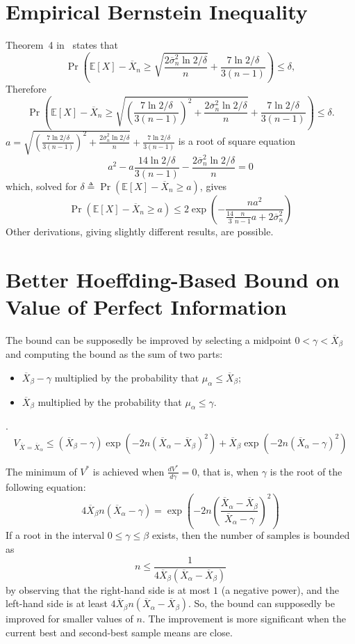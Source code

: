 \documentclass{article}
\newcommand {\IE} {\ensuremath {\mathbb{E}}}
\begin{document}
\clearpage

\appendix

\section{Empirical Bernstein Inequality}
\label{app:deriv-conc-empbernstein}

Theorem~4 in~\cite{MaurerPontil.benrstein} states that
\[\Pr\left(\IE[X]-\overline X_n \ge \sqrt { \frac {2\overline\sigma_n^2 \ln 2/\delta} n } + \frac {7 \ln 2/\delta} {3(n-1)}\right)\le \delta,\]
Therefore
\[\Pr\left(\IE[X]-\overline X_n \ge \sqrt { \left(\frac {7 \ln 2/\delta} {3(n-1)}\right)^2+\frac {2\overline\sigma_n^2 \ln 2/\delta} n } + \frac {7 \ln 2/\delta} {3(n-1)}\right)\le
\delta.\]
$a=\sqrt { \left(\frac {7 \ln 2/\delta} {3(n-1)}\right)^2+\frac {2\overline\sigma_n^2 \ln 2/\delta} n } + \frac {7 \ln 2/\delta} {3(n-1)}$ is a root of
square equation
\[a^2-a\frac {14 \ln 2/\delta} {3(n-1)} -\frac {2\overline\sigma_n^2 \ln 2/\delta} n=0\]
which, solved for $\delta\triangleq\Pr(\IE[X]-\overline X_n\ge a)$,
gives
\[\Pr(\IE[X]-\overline X_n\ge a)\le 2\exp \left( - \frac {na^2} {\frac {14} {3} \frac {n} {n-1}a+2\overline\sigma_n^2}\right)\]
Other derivations, giving slightly different results, are possible.

\section{Better Hoeffding-Based Bound on Value of Perfect Information}
\label{app:better-hoeffding-bound}

The bound can be supposedly be improved by selecting a midpoint
$0 < \gamma < \overline X_\beta$ and computing the bound as the sum of two parts:
\begin{itemize}
\item $\overline X_\beta-\gamma$ multiplied by the probability that
  $\mu_\alpha \le \overline X_\beta$;
\item $\overline X_\beta$ multiplied by the probability that $\mu_\alpha\le
  \gamma$.
\end{itemize}.
\[ V_{\overline X=\overline X_\alpha} \le (\overline X_\beta-\gamma)\exp\left(-2n(\overline X_\alpha-\overline X_\beta)^2\right)+\overline X_\beta\exp\left(-2n(\overline X_\alpha-\gamma)^2\right) \]

\vspace{\baselineskip}

The minimum of $V^*$ is achieved when $\frac {dV^*} {d\gamma}=0$, that
is, when $\gamma$ is the root of the following equation:
\[ 4\overline X_\beta n(\overline X_\alpha-\gamma)=\exp\left(-2n\left(\frac {\overline X_\alpha-\overline X_\beta}
    {\overline X_\alpha-\gamma}\right)^2\right) \]
If a root in the interval  $0\le\gamma\le\beta$ exists, then the
number of samples is bounded as
\[n\le\frac 1 {4\overline X_\beta(\overline X_\alpha-\overline X_\beta)}\]
by observing that the right-hand side 
is at most $1$ (a negative power), and the left-hand side is at least
$4\overline X_\beta n(\overline X_\alpha-\overline X_\beta)$.
So, the bound can supposedly be improved for smaller values of
$n$. The improvement is more significant when the current best and
second-best sample means are close.
\end{document}
